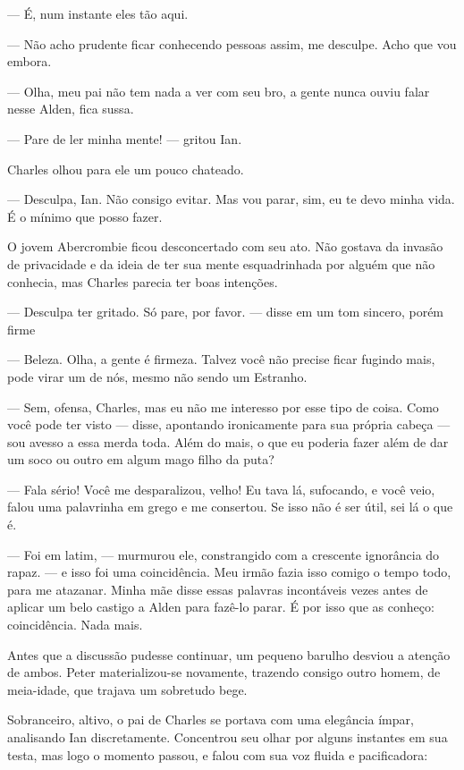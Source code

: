 --- É, num instante eles tão aqui.

--- Não acho prudente ficar conhecendo pessoas assim, me desculpe. Acho que vou
embora.

--- Olha, meu pai não tem nada a ver com seu bro, a gente nunca ouviu falar
nesse Alden, fica sussa.

--- Pare de ler minha mente! --- gritou Ian.

Charles olhou para ele um pouco chateado.

--- Desculpa, Ian. Não consigo evitar. Mas vou parar, sim, eu te devo minha
vida. É o mínimo que posso fazer.

O jovem Abercrombie ficou desconcertado com seu ato. Não gostava da invasão de
privacidade e da ideia de ter sua mente esquadrinhada por alguém que não
conhecia, mas Charles parecia ter boas intenções.

--- Desculpa ter gritado. Só pare, por favor. --- disse em um tom sincero,
porém firme

--- Beleza. Olha, a gente é firmeza. Talvez você não precise ficar fugindo
mais, pode virar um de nós, mesmo não sendo um Estranho.

--- Sem, ofensa, Charles, mas eu não me interesso por esse tipo de coisa. Como
você pode ter visto --- disse, apontando ironicamente para sua própria cabeça
--- sou avesso a essa merda toda. Além do mais, o que eu poderia fazer além de
dar um soco ou outro em algum mago filho da puta?

--- Fala sério! Você me desparalizou, velho! Eu tava lá, sufocando, e você
veio, falou uma palavrinha em grego e me consertou. Se isso não é ser útil, sei
lá o que é.

--- Foi em latim, --- murmurou ele, constrangido com a crescente ignorância do
rapaz. --- e isso foi uma coincidência. Meu irmão fazia isso comigo o tempo
todo, para me atazanar. Minha mãe disse essas palavras incontáveis vezes antes
de aplicar um belo castigo a Alden para fazê-lo parar. É por isso que as
conheço: coincidência. Nada mais.

Antes que a discussão pudesse continuar, um pequeno barulho desviou a atenção
de ambos. Peter materializou-se novamente, trazendo consigo outro homem, de
meia-idade, que trajava um sobretudo bege.

Sobranceiro, altivo, o pai de Charles se portava com uma elegância ímpar,
analisando Ian discretamente. Concentrou seu olhar por alguns instantes em sua
testa, mas logo o momento passou, e falou com sua voz fluida e pacificadora:

